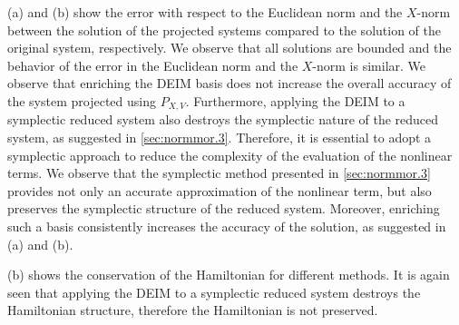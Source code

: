 (a) and (b) show the error with respect to the Euclidean norm and the $X$-norm between the solution of the projected systems compared to the solution of the original system, respectively. We observe that all solutions are bounded and the behavior of the error in the Euclidean norm and the $X$-norm is similar. We observe that enriching the DEIM basis does not increase the overall accuracy of the system projected using $P_{X,V}$. Furthermore, applying the DEIM to a symplectic reduced system also destroys the symplectic nature of the reduced system, as suggested in \cref{sec:normmor.3}. Therefore, it is essential to adopt a symplectic approach to reduce the complexity of the evaluation of the nonlinear terms. We observe that the symplectic method presented in \cref{sec:normmor.3} provides not only an accurate approximation of the nonlinear term, but also preserves the symplectic structure of the reduced system. Moreover, enriching such a basis consistently increases the accuracy of the solution, as suggested in (a) and (b).

(b) shows the conservation of the Hamiltonian for different methods. It is again seen that applying the DEIM to a symplectic reduced system destroys the Hamiltonian structure, therefore the Hamiltonian is not preserved.


